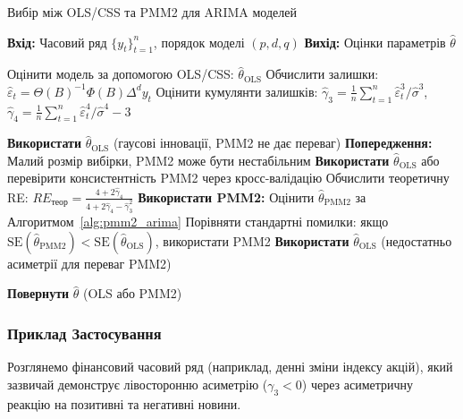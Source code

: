 \documentclass[12pt,a4paper]{article}
\begin{document}
\begin{algorithm}[H]
\caption{Вибір між OLS/CSS та PMM2 для ARIMA моделей}
\label{alg:method_selection}
\begin{algorithmic}[1]
\STATE \textbf{Вхід:} Часовий ряд $\{y_t\}_{t=1}^n$, порядок моделі $(p, d, q)$
\STATE \textbf{Вихід:} Оцінки параметрів $\hat{\theta}$

\STATE Оцінити модель за допомогою OLS/CSS: $\hat{\theta}_{\text{OLS}}$
\STATE Обчислити залишки: $\hat{\varepsilon}_t = \Theta(B)^{-1} \Phi(B) \Delta^d y_t$
\STATE Оцінити кумулянти залишків: $\hat{\gamma}_3 = \frac{1}{n} \sum_{t=1}^n \hat{\varepsilon}_t^3 / \hat{\sigma}^3$, $\hat{\gamma}_4 = \frac{1}{n} \sum_{t=1}^n \hat{\varepsilon}_t^4 / \hat{\sigma}^4 - 3$

    \STATE \textbf{Використати} $\hat{\theta}_{\text{OLS}}$ (гаусові інновації, PMM2 не дає переваг)
    \STATE \textbf{Попередження:} Малий розмір вибірки, PMM2 може бути нестабільним
    \STATE \textbf{Використати} $\hat{\theta}_{\text{OLS}}$ або перевірити консистентність PMM2 через кросс-валідацію
\ELSE
    \STATE Обчислити теоретичну RE: $RE_{\text{теор}} = \frac{4 + 2\hat{\gamma}_4}{4 + 2\hat{\gamma}_4 - \hat{\gamma}_3^2}$
        \STATE \textbf{Використати PMM2:} Оцінити $\hat{\theta}_{\text{PMM2}}$ за Алгоритмом~\ref{alg:pmm2_arima}
        \STATE Порівняти стандартні помилки: якщо $\text{SE}(\hat{\theta}_{\text{PMM2}}) < \text{SE}(\hat{\theta}_{\text{OLS}})$, використати PMM2
    \ELSE
        \STATE \textbf{Використати} $\hat{\theta}_{\text{OLS}}$ (недостатньо асиметрії для переваг PMM2)
    \ENDIF
\ENDIF

\STATE \textbf{Повернути} $\hat{\theta}$ (OLS або PMM2)
\end{algorithmic}
\end{algorithm}

\subsubsection{Приклад Застосування}

Розглянемо фінансовий часовий ряд (наприклад, денні зміни індексу акцій), який зазвичай демонструє лівосторонню асиметрію ($\gamma_3 < 0$) через асиметричну реакцію на позитивні та негативні новини.
\end{document}
